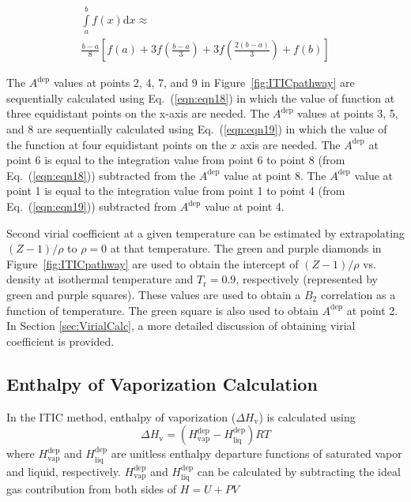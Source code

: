 \documentclass[5p,times]{elsarticle}
\begin{document}
\begin{equation}
\begin{array}{l}
{\int\limits_a^b f(x)\mathrm{d}x \approx }
\\ 
{{\frac{{b - a}}{8} \left[ {f(a) + 3f \left( \frac{{b - a}}{3} \right) + 3f \left( \frac{{2(b - a)}}{3} \right) + f(b)} \right]}}  
\end{array}
\label{eqn:eqn19}
\end{equation}

The $A^{\mathrm{dep}}$ values at points 2, 4, 7, and 9 in Figure~\ref{fig:ITICpathway} are sequentially calculated using Eq.~(\ref{eqn:eqn18}) in which the value of function at three equidistant points on the x-axis are needed. The $A^{\mathrm{dep}}$ values at points 3, 5, and 8 are sequentially calculated using Eq.~(\ref{eqn:eqn19}) in which the value of the function at four equidistant points on the $x$ axis are needed. The $A^{\mathrm{dep}}$ at point 6 is equal to the integration value from point 6 to point 8 (from Eq.~(\ref{eqn:eqn18})) subtracted from the $A^{\mathrm{dep}}$ value at point 8. The $A^{\mathrm{dep}}$ value at point 1 is equal to the integration value from point 1 to point 4 (from Eq.~(\ref{eqn:eqn19})) subtracted from $A^{\mathrm{dep}}$ value at point 4. 

Second virial coefficient at a given temperature can be estimated by extrapolating $(Z-1)/\rho$ to $\rho=0$ at that temperature. The green and purple diamonds in Figure~\ref{fig:ITICpathway} are used to obtain the intercept of $(Z-1)/\rho$ vs. density at isothermal temperature and $T_{\mathrm{r}}=0.9$, respectively (represented by green and purple squares). These values are used to obtain a $B_2$ correlation as a function of temperature. The green square is also used to obtain $A^\mathrm{dep}$ at point 2. In Section \ref{sec:VirialCalc}, a more detailed discussion of obtaining virial coefficient is provided.

\subsection{Enthalpy of Vaporization Calculation}\label{sec:HvapCalc}
In the ITIC method, enthalpy of vaporization ($\Delta H_\mathrm{v}$) is calculated using
\begin{equation}
\Delta H_\mathrm{v}= ( H^{\mathrm{dep}}_\mathrm{vap} - H^{\mathrm{dep}}_\mathrm{liq})RT
\label{eqn:Hvap}
\end{equation}
where $H^{\mathrm{dep}}_\mathrm{vap}$ and $H^{\mathrm{dep}}_\mathrm{liq}$ are unitless enthalpy departure functions of saturated vapor and liquid, respectively.
$H^{\mathrm{dep}}_\mathrm{vap}$ and $H^{\mathrm{dep}}_\mathrm{liq}$  can be calculated by subtracting the ideal gas contribution from both sides of $H=U+PV$
\end{document}
